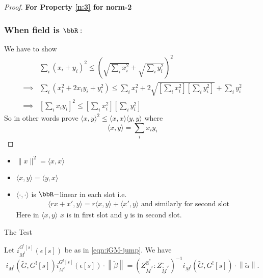 \documentclass[12pt, a3paper, openany]{book}
\begin{document}
\begin{proof}
\textbf{For Property \ref{n:3} for norm-2}	\subsubsection*{\textbf{When field is $\bbR:$}} We have to show
\begin{align*}
& \sum_i(x_i+y_i)^2\leq \left(\sqrt{\sum_ix_i^2} +\sqrt{\sum_iy_i^2}\right)^2                                       \\
\implies & \sum_i (x_i^2+2x_iy_i+y_i^2)\leq \sum_ix_i^2+2\sqrt{\left[\sum_ix_i^2\right]\left[\sum_iy_i^2\right]}+\sum_iy_i^2 \\
\implies & \left[\sum_ix_iy_i\right]^2\leq \left[\sum_ix_i^2\right]\left[\sum_iy_i^2\right]
\end{align*}
So in other words prove $\langle x,y\rangle^2 \leq \langle x,x\rangle\langle y,y\rangle$ where $$\langle x,y\rangle =\sum\limits_i x_iy_i$$
\end{proof}
\begin{note}
   \begin{itemize}
	\item $\|x\|^2=\langle x,x\rangle$
	\item $\langle x,y\rangle=\langle y,x\rangle$
	\item $\langle \cdot,\cdot\rangle$ is $\bbR-$linear in each slot i.e. 
\begin{align*}
	\langle rx+x',y\rangle=r\langle x,y\rangle+\langle x',y\rangle \text{ and similarly for second slot}
\end{align*}
Here in $\langle x,y\rangle$ $x$ is in first slot and $y$ is in second slot.
    \end{itemize}
\end{note} 
The Test\\
\begin{Cor}
    Let $i^{G^![s]}_{M^!}(\epsilon[s])$ be as in  \eqref{eqn:iGM-jump}. We have
	\[ i_{M^!}\left( \tilde{G}, G^![s] \right) i^{G^![s]}_{M^!}(\epsilon[s]) \cdot \left\|\check{\beta}\right\| =
	\left( Z_{\tilde{M}^\vee}^{\hat{\alpha}^*} : Z_{\underline{\tilde{M}}^\vee}^\circ \right)^{-1}
	i_{\underline{M}^!}\left( \tilde{G}, G^![s] \right) \cdot \left\|\check{\alpha}\right\|. \]
\end{Cor}
\end{document}
